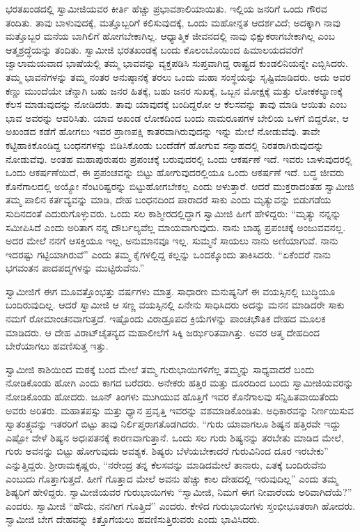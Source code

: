  ಭರತಖಂಡದಲ್ಲಿ ಸ್ವಾಮೀಜಿಯವರ ಕೀರ್ತಿ ಹೆಚ್ಚು ಪ್ರಭಾವಶಾಲಿಯಾಯಿತು. ಇಲ್ಲಿಯ ಜನರಿಗೆ ಒಂದು ಗೌರವ ತಂದಿತು. ತಾವು ಬಾಳುವುದಕ್ಕೆ, ಮತ್ತೊಬ್ಬರಿಗೆ ಕಲಿಸುವುದಕ್ಕೆ, ಒಂದು ಮಹೋನ್ನತ ಆದರ್ಶವಿದೆ; ಅದಕ್ಕಾಗಿ ನಾವು ಮತ್ತೊಬ್ಬರ ಮನೆಯ ಬಾಗಿಲಿಗೆ ಹೋಗಬೇಕಾಗಿಲ್ಲ. ಆಧ್ಯಾತ್ಮಿಕ ಜೀವನದಲ್ಲಿ ನಾವು ಭಿಕ್ಷುಕರಾಗಬೇಕಾಗಿಲ್ಲ ಎಂಬ ಆತ್ಮಶ್ರದ್ಧೆಯನ್ನು ತಂದಿತು. ಸ್ವಾಮೀಜಿ ಭರತಖಂಡಕ್ಕೆ ಬಂದು ಕೊಲಂಬೊಯಿಂದ ಹಿಮಾಲಯದವರೆಗೆ ಜ್ವಾಲಾಮಯವಾದ ಭಾಷೆಯಲ್ಲಿ ತಮ್ಮ ಭಾವವನ್ನು ವ್ಯಕ್ತಪಡಿಸಿ ಸುಪ್ತವಾಗಿದ್ದ ರಾಷ್ಟ್ರದ ಕುಂಡಲಿನಿಯನ್ನೇ ಎಬ್ಬಿಸಿದರು. ತಮ್ಮ ಭಾವನೆಗಳನ್ನು ತಮ್ಮ ನಂತರ ಅನುಷ್ಠಾನಕ್ಕೆ ತರಲು ಒಂದು ಮಹಾ ಸಂಸ್ಥೆಯನ್ನು ಸೃಷ್ಟಿಮಾಡಿದರು. ಅದು ಅವರ ಕಣ್ಣು ಮುಂದೆಯೇ ಚೆನ್ನಾಗಿ ಬಹು ಜನರ ಹಿತಕ್ಕೆ, ಬಹು ಜನರ ಸುಖಕ್ಕೆ, ಒಬ್ಬನ ಮೋಕ್ಷಕ್ಕೆ ಮತ್ತು ಲೋಕಕಲ್ಯಾಣಕ್ಕೆ ಕೆಲಸ ಮಾಡುವುದನ್ನು ನೋಡಿದರು. ತಾವು ಯಾವುದಕ್ಕೆ ಬಂದಿದ್ದರೋ ಆ ಕೆಲಸವನ್ನು ತಾವು ಮಾಡಿ ಆಯಿತು ಎಂಬ ಭಾವ ಅವರನ್ನು ಆವರಿಸಿತು. ಯಾವ ಅಖಂಡ ಲೋಕದಿಂದ ಬಂದು ನಾಮರೂಪಗಳ ಬೇಲಿಯ ಒಳಗೆ ಬಿದ್ದರೋ, ಆ ಅಖಂಡದ ಕಡೆಗೆ ಹೋಗಲು ಇವರ ಪ್ರಾಣಪಕ್ಷಿ ಕಾತರವಾಗಿರುವುದನ್ನು ಇನ್ನು ಮೇಲೆ ನೋಡುವೆವು. ತಾವೇ ಕಟ್ಟಿಹಾಕಿಕೊಂಡಿದ್ದ ಬಂಧನಗಳನ್ನು ಬಿಡಿಸಿಕೊಂಡು ಬಂದೆಡೆಗೆ ಹೋಗುವ ಸನ್ನಾಹದಲ್ಲಿ ನಿರತರಾಗಿರುವುದನ್ನು ನೋಡುವೆವು. ಅಂತಹ ಮಹಾಪುರುಷರು ಪ್ರಪಂಚಕ್ಕೆ ಬರುವುದರಲ್ಲಿ ಒಂದು ಆಕರ್ಷಣೆ ಇದೆ. ಇವರು ಬಾಳುವುದರಲ್ಲಿ ಒಂದು ಆಕರ್ಷಣೆಯಿದೆ, ಈ ಪ್ರಪಂಚವನ್ನು ಬಿಟ್ಟು ಹೋಗುವುದರಲ್ಲಿಯೂ ಒಂದು ಆಕರ್ಷಣೆ ಇದೆ. ಬದ್ಧ ಜೀವರು ಕೊನೆಗಾಲದಲ್ಲಿ ಅಯ್ಯೋ ನೆಂಟರಿಷ್ಟರನ್ನು ಬಿಟ್ಟುಹೋಗಬೇಕಲ್ಲ ಎಂದು ಅಳುತ್ತಾರೆ. ಆದರೆ ಮುಕ್ತರಾದಂತಹ ಸ್ವಾಮೀಜಿ ತಮ್ಮ ಪಾಲಿನ ಕರ್ತವ್ಯವನ್ನು ಮಾಡಿ, ದೇಹ ಬಂಧನದಿಂದ ಪಾರಾದರೆ ಸಾಕು ಎಂದು ಮೃತ್ಯುವನ್ನು ಬಿಡುಗಡೆಯ ಸುದಿನದಂತೆ ಎದುರುಗೊಳ್ಳುವರು. ಒಂದು ಸಲ ಕಾಶ್ಮೀರದಲ್ಲಿದ್ದಾಗ ಸ್ವಾಮೀಜಿ ಹೀಗೆ ಹೇಳಿದ್ದರು: “ಮೃತ್ಯು ನನ್ನನ್ನು ಸಮೀಪಿಸಿದೆ ಎಂದು ಅರಿತಾಗ ನನ್ನ ದೌರ್ಬಲ್ಯವೆಲ್ಲ ಮಾಯವಾಗುವುದು. ನಾನು ಬಾಹ್ಯ ಪ್ರಪಂಚಕ್ಕೆ ಅಂಜುವವನಲ್ಲ. ಅದರ ಮೇಲೆ ನನಗೆ ಆಸಕ್ತಿಯೂ ಇಲ್ಲ, ಅನುಮಾನವೂ ಇಲ್ಲ. ಸುಮ್ಮನೆ ಸಾಯಲು ನಾನು ಅಣಿಯಾಗುವೆ. ನಾನು ಇದರಷ್ಟು ಗಟ್ಟಿಯಾಗಿರುವೆ” ಎಂದು ತಮ್ಮ ಕೈಗಳಲ್ಲಿದ್ದ ಕಲ್ಲನ್ನು ಒಂದಕ್ಕೊಂದು ತಾಕಿಸಿದರು. “ಏಕೆಂದರೆ ನಾನು ಭಗವಂತನ ಪಾದಪದ್ಮಗಳನ್ನು ಮುಟ್ಟಿರುವೆನು.” 

 ಸ್ವಾಮೀಜಿಗೆ ಈಗ ಮೂವತ್ತೊಂಭತ್ತು ವರ್ಷಗಳು ಮಾತ್ರ. ಸಾಧಾರಣ ಮನುಷ್ಯನಿಗೆ ಈ ವಯಸ್ಸಿನಲ್ಲಿ ಬುದ್ಧಿಯೂ ಬಂದಿರುವುದಿಲ್ಲ. ಆದರೆ ಸ್ವಾಮೀಜಿ ಆ ಸಣ್ಣ ವಯಸ್ಸಿನಲ್ಲಿ ಏನೇನು ಸಾಧಿಸಿದರು ಅದನ್ನು ಮನನ ಮಾಡಿದರೇ ಸಾಕು ನಮಗೆ ರೋಮಾಂಚನವಾಗುತ್ತದೆ. ಇಷ್ಟೊಂದು ವಿರಾಡ್ರೂಪದ ಕ್ರಿಯೆಗಳನ್ನು ಪಾಂಚಭೌತಿಕ ದೇಹದ ಮೂಲಕ ಮಾಡಿದರು. ಆ ದೇಹ ವಿರಾಟ್‌ಚೈತನ್ಯದ ಮಹಾಲೀಲೆಗೆ ಸಿಕ್ಕಿ ಜರ್ಝರಿತವಾಗಿತ್ತು. ಅವರ ಆತ್ಮ ದೇಹದಿಂದ ಬೇರೆಯಾಗಲು ಹವಣಿಸುತ್ತ ಇತ್ತು. 

 ಸ್ವಾಮೀಜಿ ಕಾಶಿಯಿಂದ ಮಠಕ್ಕೆ ಬಂದ ಮೇಲೆ ತಮ್ಮ ಗುರುಭಾಯಿಗಳಿಗೆಲ್ಲ ತಮ್ಮನ್ನು ಸಾಧ್ಯವಾದರೆ ಬಂದು ನೋಡಿಕೊಂಡು ಹೋಗಿ ಎಂದು ಕಾಗದ ಬರೆದರು. ಅನೇಕರು ಹತ್ತಿರ ಮತ್ತು ದೂರದಿಂದ ಬಂದು ಸ್ವಾಮೀಜಿಯವರನ್ನು ನೋಡಿಕೊಂಡು ಹೋದರು. ಜೂನ್ ತಿಂಗಳು ಮುಗಿಯುವ ಹೊತ್ತಿಗೆ ಇವರ ಕೊನೆಗಾಲವು ಸನ್ನಿಹಿತವಾಯಿತೆಂದು ಅವರು ಅರಿತರು. ಮಹಾತಪಸ್ಸು ಮತ್ತು ಧ್ಯಾನ ಪ್ರವೃತ್ತಿ ಇವರನ್ನು ವಶಮಾಡಿಕೊಂಡಿತು. ಅಧಿಕಾರವನ್ನು ನಿರ್ಣಯಿಸುವ ಸ್ವಾತಂತ್ರ್ಯವನ್ನು ಇತರರಿಗೆ ಬಿಟ್ಟು ತಾವು ನಿರ್ಲಿಪ್ತರಾಗತೊಡಗಿದರು. “ಗುರು ಯಾವಾಗಲೂ ಶಿಷ್ಯನ ಹತ್ತಿರವೇ ಇದ್ದು ಎಷ್ಟೋ ವೇಳೆ ಶಿಷ್ಯನ ಅಧಃಪತನಕ್ಕೆ ಕಾರಣವಾಗುತ್ತಾನೆ. ಒಂದು ಸಲ ಗುರು ಶಿಷ್ಯನನ್ನು ತರಬೇತು ಮಾಡಿದ ಮೇಲೆ, ಗುರು ಅವನನ್ನು ಬಿಟ್ಟು ಹೋಗುವುದು ಅವಶ್ಯಕ. ಶಿಷ್ಯರು ಬೆಳೆಯಬೇಕಾದರೆ ಗುರುವಿನಿಂದ ದೂರ ಇರಬೇಕು” ಎನ್ನುತ್ತಿದ್ದರು. ಶ‍್ರೀರಾಮಕೃಷ್ಣರು, “ನರೇಂದ್ರ ತನ್ನ ಕೆಲಸವನ್ನು ಮಾಡಿದಮೇಲೆ ತಾನಾರು, ಏತಕ್ಕೆ ಬಂದಿರುವೆನು ಎಂಬುದು ಗೊತ್ತಾಗುತ್ತದೆ. ಹೀಗೆ ಗೊತ್ತಾದ ಮೇಲೆ ಅವನು ಹೆಚ್ಚು ಕಾಲ ದೇಹದಲ್ಲಿ ಇರುವುದಿಲ್ಲ” ಎಂದು ತಮ್ಮ ಶಿಷ್ಯರಿಗೆ ಹೇಳಿದ್ದರು. ಸ್ವಾಮೀಜಿಯವರ ಗುರುಭಾಯಿಗಳು “ಸ್ವಾಮೀಜಿ, ನಿಮಗೆ ಈಗ ನೀವಾರೆಂದು ಅರಿವಾಗಿದೆಯೆ?” ಎಂದರು. ಸ್ವಾಮೀಜಿ “ಹೌದು, ನನಗೀಗ ಗೊತ್ತಿದೆ” ಎಂದರು. ಕೇಳಿದ ಗುರುಭಾಯಿಗಳು ಸ್ತಂಭೀಭೂತರಾಗಿ ಹೋದರು. ಸ್ವಾಮೀಜಿ ಬೇಗ ದೇಹವನ್ನು ಕಿತ್ತೊಗೆಯಲು ಹವಣಿಸುತ್ತಿರುವರು ಎಂದು ಭಾವಿಸಿದರು. 

